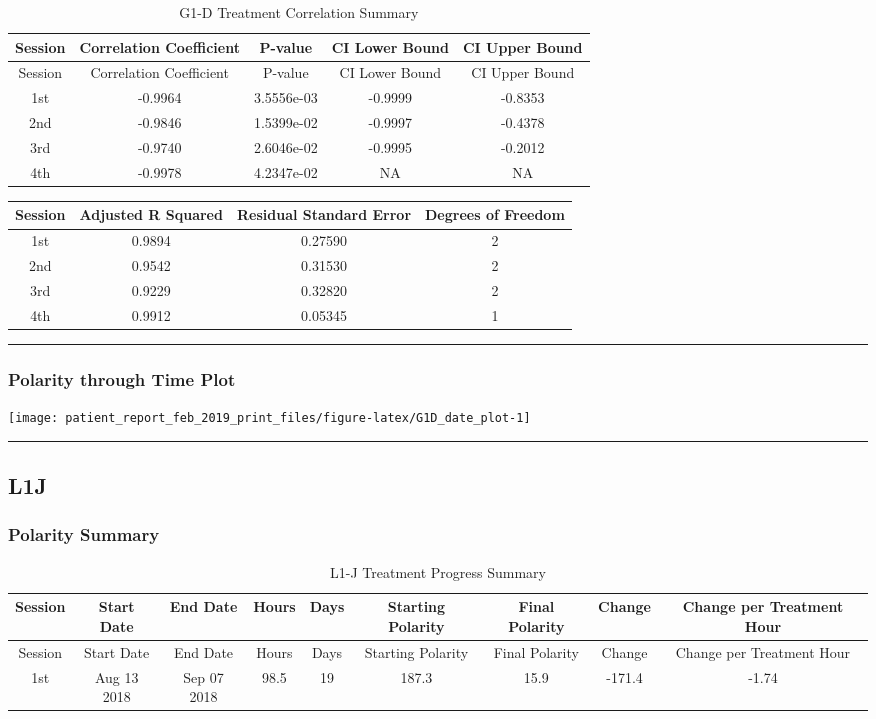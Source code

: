 \documentclass[]{article}
\begin{document}
\begin{longtable}[]{@{}ccccc@{}}
\caption{G1-D Treatment Correlation Summary}\tabularnewline
\toprule
Session & Correlation Coefficient & P-value & CI Lower Bound & CI Upper
Bound\tabularnewline
\midrule
\endfirsthead
\toprule
Session & Correlation Coefficient & P-value & CI Lower Bound & CI Upper
Bound\tabularnewline
\midrule
\endhead
1st & -0.9964 & 3.5556e-03 & -0.9999 & -0.8353\tabularnewline
2nd & -0.9846 & 1.5399e-02 & -0.9997 & -0.4378\tabularnewline
3rd & -0.9740 & 2.6046e-02 & -0.9995 & -0.2012\tabularnewline
4th & -0.9978 & 4.2347e-02 & NA & NA\tabularnewline
\bottomrule
\end{longtable}

\begin{longtable}[]{@{}cccc@{}}
\toprule
Session & Adjusted R Squared & Residual Standard Error & Degrees of
Freedom\tabularnewline
\midrule
\endhead
1st & 0.9894 & 0.27590 & 2\tabularnewline
2nd & 0.9542 & 0.31530 & 2\tabularnewline
3rd & 0.9229 & 0.32820 & 2\tabularnewline
4th & 0.9912 & 0.05345 & 1\tabularnewline
\bottomrule
\end{longtable}

\begin{center}\rule{0.5\linewidth}{\linethickness}\end{center}

\subsubsection{Polarity through Time
Plot}\label{polarity-through-time-plot-5}

\texttt{[image: patient\_report\_feb\_2019\_print\_files/figure-latex/G1D\_date\_plot-1]}

\begin{center}\rule{0.5\linewidth}{\linethickness}\end{center}

\subsection{L1J}\label{l1j}

\subsubsection{Polarity Summary}\label{polarity-summary-6}

\begin{longtable}[]{@{}ccccccccc@{}}
\caption{L1-J Treatment Progress Summary}\tabularnewline
\toprule
Session & Start Date & End Date & Hours & Days & Starting Polarity &
Final Polarity & Change & Change per Treatment Hour\tabularnewline
\midrule
\endfirsthead
\toprule
Session & Start Date & End Date & Hours & Days & Starting Polarity &
Final Polarity & Change & Change per Treatment Hour\tabularnewline
\midrule
\endhead
1st & Aug 13 2018 & Sep 07 2018 & 98.5 & 19 & 187.3 & 15.9 & -171.4 &
-1.74\tabularnewline
\bottomrule
\end{longtable}
\end{document}
